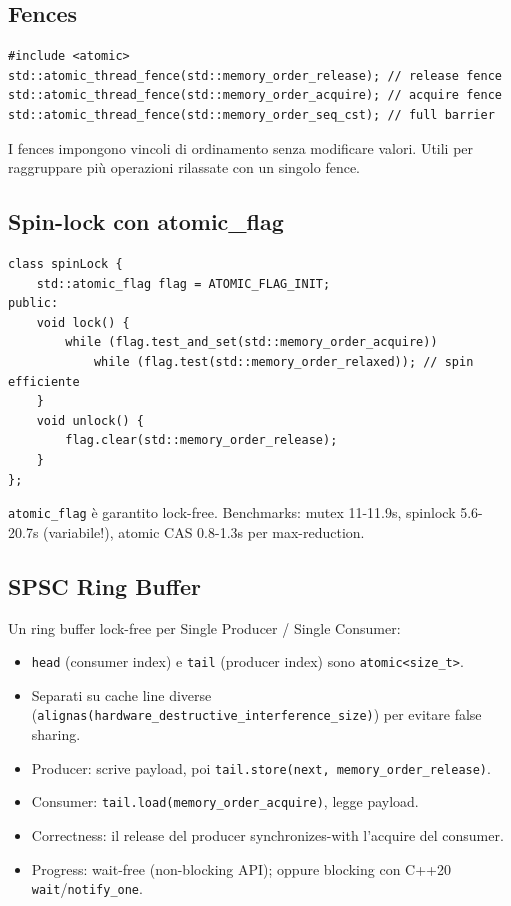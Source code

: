 \documentclass[11pt,a4paper]{article}
\theoremstyle{remark}
\begin{document}
\subsection{Fences}

\begin{lstlisting}
#include <atomic>
std::atomic_thread_fence(std::memory_order_release); // release fence
std::atomic_thread_fence(std::memory_order_acquire); // acquire fence
std::atomic_thread_fence(std::memory_order_seq_cst); // full barrier
\end{lstlisting}

I fences impongono vincoli di ordinamento senza modificare valori. Utili per raggruppare più operazioni rilassate con un singolo fence.

\subsection{Spin-lock con atomic\_flag}

\begin{lstlisting}
class spinLock {
    std::atomic_flag flag = ATOMIC_FLAG_INIT;
public:
    void lock() {
        while (flag.test_and_set(std::memory_order_acquire))
            while (flag.test(std::memory_order_relaxed)); // spin efficiente
    }
    void unlock() {
        flag.clear(std::memory_order_release);
    }
};
\end{lstlisting}

\texttt{atomic\_flag} è garantito lock-free. Benchmarks: mutex 11-11.9s, spinlock 5.6-20.7s (variabile!), atomic CAS 0.8-1.3s per max-reduction.

\subsection{SPSC Ring Buffer}

Un ring buffer lock-free per Single Producer / Single Consumer:

\begin{itemize}
  \item \texttt{head} (consumer index) e \texttt{tail} (producer index) sono \texttt{atomic<size\_t>}.
  \item Separati su cache line diverse (\texttt{alignas(hardware\_destructive\_interference\_size)}) per evitare false sharing.
  \item Producer: scrive payload, poi \texttt{tail.store(next, memory\_order\_release)}.
  \item Consumer: \texttt{tail.load(memory\_order\_acquire)}, legge payload.
  \item Correctness: il release del producer synchronizes-with l'acquire del consumer.
  \item Progress: wait-free (non-blocking API); oppure blocking con C++20 \texttt{wait}/\texttt{notify\_one}.
\end{itemize}
\end{document}
